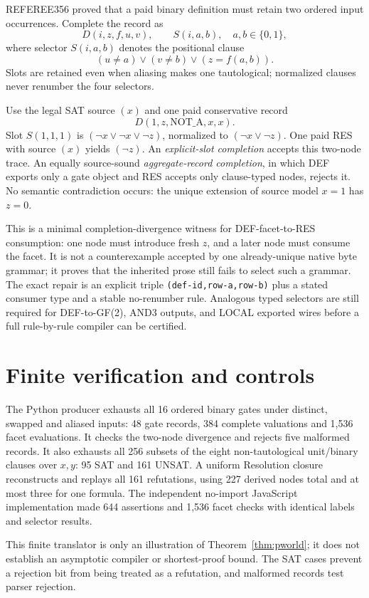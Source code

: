 \documentclass[11pt]{article}
\begin{document}
REFEREE356 proved that a paid binary definition must retain two ordered input occurrences.  Complete the record as
\[
D(i,z,f,u,v),\qquad S(i,a,b),\quad a,b\in\{0,1\},
\]
where selector $S(i,a,b)$ denotes the positional clause
\[
(u\ne a)\lor(v\ne b)\lor(z=f(a,b)).
\]
Slots are retained even when aliasing makes one tautological; normalized clauses never renumber the four selectors.

Use the legal SAT source $(x)$ and one paid conservative record
\[
D(1,z,\mathrm{NOT\_A},x,x).
\]
Slot $S(1,1,1)$ is $(\neg x\lor\neg x\lor\neg z)$, normalized to $(\neg x\lor\neg z)$.  One paid RES with source $(x)$ yields $(\neg z)$.  An \emph{explicit-slot completion} accepts this two-node trace.  An equally source-sound \emph{aggregate-record completion}, in which DEF exports only a gate object and RES accepts only clause-typed nodes, rejects it.  No semantic contradiction occurs: the unique extension of source model $x=1$ has $z=0$.

This is a minimal completion-divergence witness for DEF-facet-to-RES consumption: one node must introduce fresh $z$, and a later node must consume the facet.  It is not a counterexample accepted by one already-unique native byte grammar; it proves that the inherited prose still fails to select such a grammar.  The exact repair is an explicit triple \texttt{(def-id,row-a,row-b)} plus a stated consumer type and a stable no-renumber rule.  Analogous typed selectors are still required for DEF-to-GF(2), AND3 outputs, and LOCAL exported wires before a full rule-by-rule compiler can be certified.

\section{Finite verification and controls}

The Python producer exhausts all 16 ordered binary gates under distinct, swapped and aliased inputs: 48 gate records, 384 complete valuations and 1,536 facet evaluations.  It checks the two-node divergence and rejects five malformed records.  It also exhausts all 256 subsets of the eight non-tautological unit/binary clauses over $x,y$: 95 SAT and 161 UNSAT.  A uniform Resolution closure reconstructs and replays all 161 refutations, using 227 derived nodes total and at most three for one formula.  The independent no-import JavaScript implementation made 644 assertions and 1,536 facet checks with identical labels and selector results.

This finite translator is only an illustration of Theorem~\ref{thm:pworld}; it does not establish an asymptotic compiler or shortest-proof bound.  The SAT cases prevent a rejection bit from being treated as a refutation, and malformed records test parser rejection.
\end{document}
